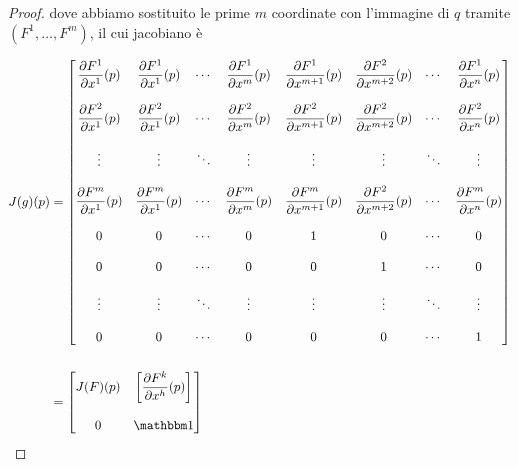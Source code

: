 \begin{proof}
	dove abbiamo sostituito le prime $ m $ coordinate con l'immagine di $ q $ tramite $ (F^{1},\dots,F^{m}) $, il cui jacobiano è
	
	\begin{align}
		\begin{split}
			J(g)(p) &= %
			\begin{bmatrix}
				\dfrac{\partial F^{1}}{\partial x^{1}} (p) & \dfrac{\partial F^{1}}{\partial x^{1}} (p) & \cdots & \dfrac{\partial F^{1}}{\partial x^{m}} (p) & \dfrac{\partial F^{1}}{\partial x^{m+1}} (p) & \dfrac{\partial F^{2}}{\partial x^{m+2}} (p) & \cdots & \dfrac{\partial F^{1}}{\partial x^{n}} (p) \\\\
				\dfrac{\partial F^{2}}{\partial x^{1}} (p) & \dfrac{\partial F^{2}}{\partial x^{1}} (p) & \cdots & \dfrac{\partial F^{2}}{\partial x^{m}} (p) & \dfrac{\partial F^{2}}{\partial x^{m+1}} (p) & \dfrac{\partial F^{2}}{\partial x^{m+2}} (p) & \cdots & \dfrac{\partial F^{2}}{\partial x^{n}} (p) \\\\
				\vdots & \vdots & \ddots & \vdots & \vdots & \vdots & \ddots & \vdots \\\\
				\dfrac{\partial F^{m}}{\partial x^{1}} (p) & \dfrac{\partial F^{m}}{\partial x^{1}} (p) & \cdots & \dfrac{\partial F^{m}}{\partial x^{m}} (p) & \dfrac{\partial F^{m}}{\partial x^{m+1}} (p) & \dfrac{\partial F^{2}}{\partial x^{m+2}} (p) & \cdots & \dfrac{\partial F^{m}}{\partial x^{n}} (p) \\\\
				0 & 0 & \cdots & 0 & 1 & 0 & \cdots & 0 \\\\
				0 & 0 & \cdots & 0 & 0 & 1 & \cdots & 0 \\\\
				\vdots & \vdots & \ddots & \vdots & \vdots & \vdots & \ddots & \vdots \\\\
				0 & 0 & \cdots & 0 & 0 & 0 & \cdots & 1
			\end{bmatrix}\\\\%
			&= %
			\begin{bmatrix}
				J(F)(p) & \left[ \dfrac{\partial F^{k}}{\partial x^{h}} (p) \right] \\\\
				0 & \bigone
			\end{bmatrix}
		\end{split}
	\end{align}


\end{proof}
